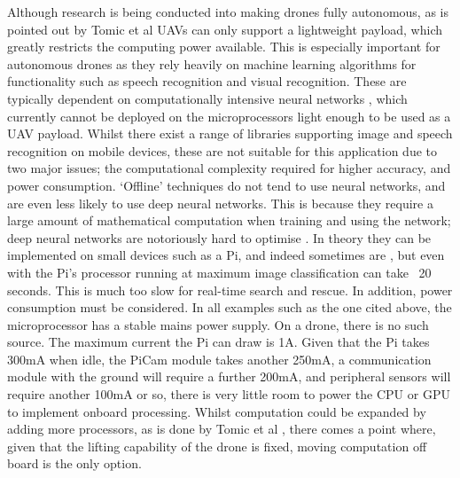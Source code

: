\documentclass{article}
\begin{document}
Although research is being conducted into making drones fully autonomous, as is pointed out by Tomic et al  \cite{Autonomous} UAVs can only support a lightweight payload, which greatly restricts the computing power available. This is especially important for autonomous drones as they rely heavily on machine learning algorithms for functionality such as speech recognition and visual recognition. These are typically dependent on computationally intensive neural networks \cite{Neural}, which currently cannot be deployed on the microprocessors light enough to be used as a UAV payload. Whilst there exist a range of libraries supporting image and speech recognition on mobile devices, these are not suitable for this application due to two major issues; the computational complexity required for higher accuracy, and power consumption. `Offline' techniques do not tend to use neural networks, and are even less likely to use deep neural networks. This is because they require a large amount of mathematical computation when training and using the network; deep neural networks are notoriously hard to optimise \cite{DeepAI}. In theory they can be implemented on small devices such as a Pi, and indeed sometimes are \cite{DeepPi}, but even with the Pi's processor running at maximum image classification can take ~20 seconds. This is much too slow for real-time search and rescue. In addition, power consumption must be considered. In all examples such as the one cited above, the microprocessor has a stable mains power supply. On a drone, there is no such source. The maximum current the Pi can draw is 1A. Given that the Pi takes 300mA when idle, the PiCam module takes another 250mA, a communication module with the ground will require a further 200mA, and peripheral sensors will require another 100mA or so, there is very little room to power the CPU or GPU to implement onboard processing. Whilst computation could be expanded by adding more processors, as is done by Tomic et al \cite{Autonomous}, there comes a point where, given that the lifting capability of the drone is fixed, moving computation off board is the only option.
\end{document}
